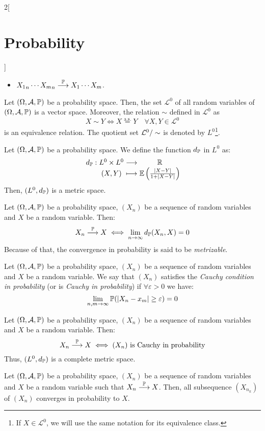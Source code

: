 \documentclass[../../../main.tex]{subfiles}
\begin{document}
\begin{multicols}{2}[\section{Probability}]
\begin{corollary}
\begin{itemize}
      \item ${X_1}_n\cdots{X_m}_n\overset{\mathbb{P}}{\longrightarrow}X_1\cdots X_m$.
    \end{itemize}
  \end{corollary}
  \begin{lemma}
    Let $(\Omega,\mathcal{A},\mathbb{P})$ be a probability space. Then, the set $\mathcal{L}^0$ of all random variables of $(\Omega,\mathcal{A},\mathbb{P})$ is a vector space. Moreover, the relation $\sim$ defined in $\mathcal{L}^0$ as $$X\sim Y\iff X\overset{\text{a.s.}}{=} Y\quad\forall X,Y\in\mathcal{L}^0$$ is an equivalence relation. The quotient set $\quot{\mathcal{L}^0}{\sim}$ is denoted by $L^0$\footnote{If $X\in\mathcal{L}^0$, we will use the same notation for its equivalence class.}.
  \end{lemma}
  \begin{prop}
    Let $(\Omega,\mathcal{A},\mathbb{P})$ be a probability space. We define the function $d_{\mathbb{P}}$ in $L^0$ as:
    $$\function{d_\Prob}{L^0\times L^0}{\RR}{(X,Y)}{\Exp\left(\frac{|X-Y|}{1+|X-Y|}\right)}$$
    Then, $(L^0,d_{\mathbb{P}})$ is a metric space.
  \end{prop}
  \begin{prop}
    Let $(\Omega,\mathcal{A},\mathbb{P})$ be a probability space, $(X_n)$ be a sequence of random variables and $X$ be a random variable. Then:
    $$X_n\overset{\mathbb{P}}{\longrightarrow} X\iff\lim_{n\to\infty} d_{\mathbb{P}}(X_n,X)=0$$
    Because of that, the convergence in probability is said to be \textit{metrizable}.
  \end{prop}
  \begin{definition}
    Let $(\Omega,\mathcal{A},\mathbb{P})$ be a probability space, $(X_n)$ be a sequence of random variables and $X$ be a random variable. We say that $(X_n)$ satisfies the \textit{Cauchy condition in probability} (or is \textit{Cauchy in probability}) if $\forall \varepsilon >0$ we have: $$\lim_{n,m\to\infty}\mathbb{P}(|X_n-x_m|\geq \varepsilon)=0$$
  \end{definition}
  \begin{prop}
    Let $(\Omega,\mathcal{A},\mathbb{P})$ be a probability space, $(X_n)$ be a sequence of random variables and $X$ be a random variable. Then:
    $$X_n\overset{\mathbb{P}}{\longrightarrow} X\iff(X_n)\text{ is Cauchy in probability}$$
    Thus, $(L^0,d_{\mathbb{P}})$ is a complete metric space.
  \end{prop}
  \begin{prop}
    Let $(\Omega,\mathcal{A},\mathbb{P})$ be a probability space, $(X_n)$ be a sequence of random variables and $X$ be a random variable such that $X_n\overset{\mathbb{P}}{\longrightarrow} X$. Then, all subsequence $(X_{n_k})$ of $(X_n)$ converges in probability to $X$.
  \end{prop}

\end{multicols}
\end{document}
